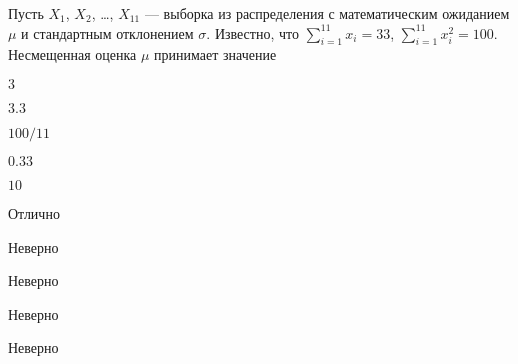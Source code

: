 
\begin{question}
Пусть \(X_1\), \(X_2\), \ldots, \(X_{11}\) — выборка из распределения
с математическим ожиданием \(\mu\) и стандартным отклонением \(\sigma\).
Известно, что \(\sum_{i=1}^{11}x_i=33\), \(\sum_{i=1}^{11}x_i^2=100\).
Несмещенная оценка \(\mu\) принимает значение
\begin{answerlist}
  \item \(3\)
  \item \(3.3\)
  \item \(100/11\)
  \item \(0.33\)
  \item \(10\)
\end{answerlist}
\end{question}

\begin{solution}
\begin{answerlist}
  \item Отлично
  \item Неверно
  \item Неверно
  \item Неверно
  \item Неверно
\end{answerlist}
\end{solution}

